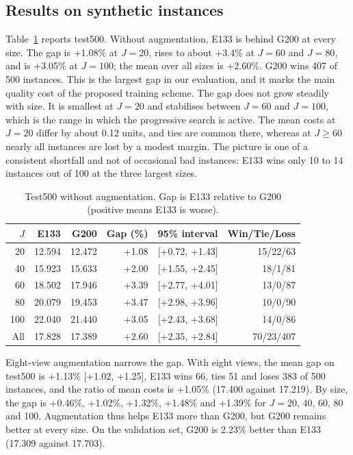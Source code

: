 \documentclass[preprint,12pt,authoryear]{elsarticle}
\begin{document}
\subsection{Results on synthetic instances}
\label{sec:synthetic}

Table~\ref{tab:test500} reports test500. Without augmentation, E133 is behind G200 at every size. The gap is +1.08\% at $J = 20$, rises to about +3.4\% at $J = 60$ and $J = 80$, and is +3.05\% at $J = 100$; the mean over all sizes is +2.60\%. G200 wins 407 of 500 instances. This is the largest gap in our evaluation, and it marks the main quality cost of the proposed training scheme. The gap does not grow steadily with size. It is smallest at $J = 20$ and stabilises between $J = 60$ and $J = 100$, which is the range in which the progressive search is active. The mean costs at $J = 20$ differ by about 0.12 units, and ties are common there, whereas at $J \ge 60$ nearly all instances are lost by a modest margin. The picture is one of a consistent shortfall and not of occasional bad instances: E133 wins only 10 to 14 instances out of 100 at the three largest sizes.

\begin{table}[t]
\centering
\caption{Test500 without augmentation. Gap is E133 relative to G200 (positive means E133 is worse).}
\label{tab:test500}
\small
\begin{tabular}{rrrrrr}
\toprule
$J$ & E133 & G200 & Gap (\%) & 95\% interval & Win/Tie/Loss \\
\midrule
20 & 12.594 & 12.472 & +1.08 & [+0.72, +1.43] & 15/22/63 \\
40 & 15.923 & 15.633 & +2.00 & [+1.55, +2.45] & 18/1/81 \\
60 & 18.502 & 17.946 & +3.39 & [+2.77, +4.01] & 13/0/87 \\
80 & 20.079 & 19.453 & +3.47 & [+2.98, +3.96] & 10/0/90 \\
100 & 22.040 & 21.440 & +3.05 & [+2.43, +3.68] & 14/0/86 \\
All & 17.828 & 17.389 & +2.60 & [+2.35, +2.84] & 70/23/407 \\
\bottomrule
\end{tabular}
\end{table}

Eight-view augmentation narrows the gap. With eight views, the mean gap on test500 is +1.13\% [+1.02, +1.25], E133 wins 66, ties 51 and loses 383 of 500 instances, and the ratio of mean costs is +1.05\% (17.400 against 17.219). By size, the gap is +0.46\%, +1.02\%, +1.32\%, +1.48\% and +1.39\% for $J = 20$, 40, 60, 80 and 100. Augmentation thus helps E133 more than G200, but G200 remains better at every size. On the validation set, G200 is 2.23\% better than E133 (17.309 against 17.703).
\end{document}
